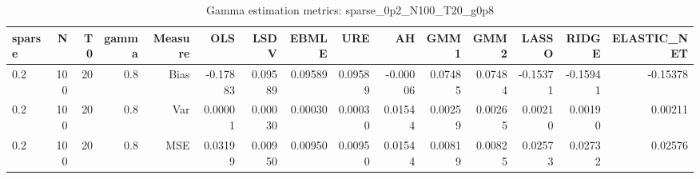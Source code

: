 \begin{table}[!htbp]\centering
\caption{Gamma estimation metrics: sparse_0p2_N100_T20_g0p8}
\label{tab:table1_sparse_0p2_N100_T20_g0p8}
\begin{tabular}{lrrrrrrrrrrrrrr}
\hline
sparse & N & T0 & gamma & Measure & OLS & LSDV & EBMLE & URE & AH & GMM1 & GMM2 & LASSO & RIDGE & ELASTIC_NET \\
\hline
0.2 & 100 & 20 & 0.8 & Bias & -0.17883 & 0.09589 & 0.09589 & 0.09589 & -0.00006 & 0.07485 & 0.07484 & -0.15371 & -0.15941 & -0.15378 \\
0.2 & 100 & 20 & 0.8 & Var & 0.00001 & 0.00030 & 0.00030 & 0.00030 & 0.01544 & 0.00259 & 0.00265 & 0.00210 & 0.00190 & 0.00211 \\
0.2 & 100 & 20 & 0.8 & MSE & 0.03199 & 0.00950 & 0.00950 & 0.00950 & 0.01544 & 0.00819 & 0.00825 & 0.02573 & 0.02732 & 0.02576 \\
\hline
\end{tabular}
\end{table}

